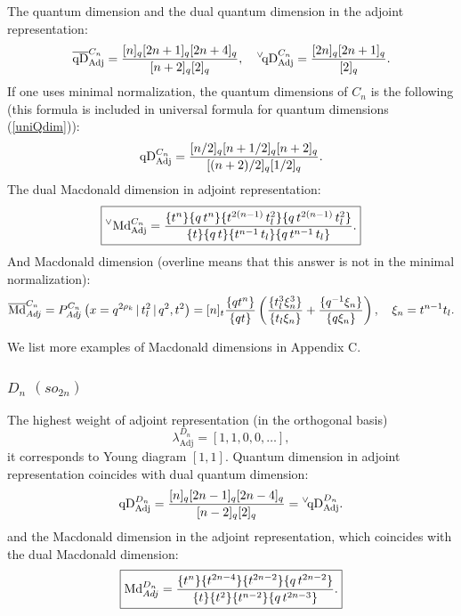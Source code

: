 \documentclass{article}
\def\MD{\hbox{Md}}%
\def\qDv{{^\vee\!\hbox{qD}}}
\def\qD{\hbox{qD}}
\def\MD{\hbox{Md}}%
\def\qDv{{^\vee\!\hbox{qD}}}
\def\qD{\hbox{qD}}
\def\Adj{\text{Adj}}
\begin{document}
The quantum dimension and the dual quantum dimension in the adjoint representation:
\begin{equation}
   \overline{\qD}^{C_n}_{\Adj} = \frac{[n]_q[2n+1]_q[2n+4]_q}{[n+2]_q[2]_q}, \quad \qDv_{\Adj}^{C_n} = \frac{[2n]_q[2n+1]_q}{[2]_q}.
\end{equation}
If one uses minimal normalization, the quantum dimensions of $C_n$ is the following (this formula is included in universal formula for quantum dimensions (\ref{uniQdim})):
\begin{equation}
  \qD^{C_n}_{\Adj} = \frac{[n/2]_q[n+1/2]_q[n+2]_q}{[(n+2)/2]_q[1/2]_q}.
\end{equation}
The dual Macdonald dimension in adjoint representation:
\begin{equation}
\boxed{
    ^{\vee}\MD_{\Adj}^{C_n} = \frac{\{t^n\}\{q\,t^n\} \{t^{2(n-1)}\,t_l^2\}\{q\,t^{2(n-1)}\,t_l^2\}}{\{t\}\{q\,t\} \{t^{n-1}\,t_l\}\{q\,t^{n-1}\,t_l\}}.}
\end{equation}
And Macdonald dimension (overline means that this answer is not in the minimal normalization):
\begin{equation}
    \overline{\MD}^{C_n}_{Adj}=  P^{C_n}_{Adj}\left(x = q^{2\rho_k}\,|\,t_l^2\,|\,q^2,t^2\right) =
    [n]_t{\{q t^n\}\over\{q t\}}\left({\{t_l^3\xi_n^3\} \over \{t_l\xi_n\}}+{\{q^{-1} \xi_n\}\over \{q\xi_n\}}\right), \quad \xi_n = t^{n-1} t_l.
\end{equation}

We list more examples of Macdonald dimensions in Appendix C.

\subsubsection{$D_n$ $(so_{2n})$}
The highest weight of adjoint representation (in the orthogonal basis)
\begin{equation}
    \lambda_{\Adj}^{D_n} = [1,1,0,0,\dots],
\end{equation}
it corresponds to Young diagram $[1,1]$.
Quantum dimension in adjoint representation coincides with dual quantum dimension:
\begin{equation}
    \qD_{\Adj}^{D_n} = \frac{[n]_q [2n-1]_q [2n-4]_q}{[n-2]_q[2]_q} =  \qDv_{\Adj}^{D_n}.
\end{equation}
and the Macdonald dimension in the adjoint representation, which coincides with the dual Macdonald dimension:
\begin{equation}
\boxed{
    \MD_{Adj}^{D_n} = \frac{ \{t^n\} \{t^{2 n-4}\} \{t^{2
   n-2}\} \{q\, t^{2 n-2}\}}{\{t\} \{t^2\}
  \{t^{n-2}\} \{q\, t^{2 n-3}\}}.}
  \label{MacDimD}
\end{equation}
\end{document}

